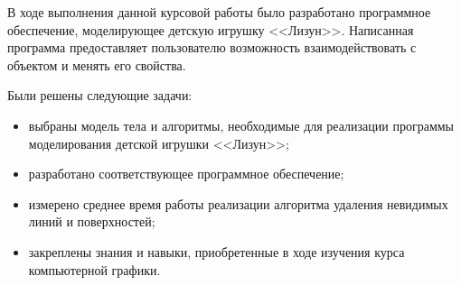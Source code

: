 
В ходе выполнения данной курсовой работы было разработано программное обеспечение, моделирующее детскую игрушку <<Лизун>>. Написанная программа предоставляет пользователю возможность взаимодействовать с объектом и менять его свойства.

Были решены следующие задачи:
\begin{itemize}
	\item выбраны модель тела и алгоритмы, необходимые для реализации программы моделирования детской игрушки <<Лизун>>;
	\item разработано соответствующее программное обеспечение;
	\item измерено среднее время работы реализации алгоритма удаления невидимых линий и поверхностей;
	\item закреплены знания и навыки, приобретенные в ходе изучения курса компьютерной графики.
\end{itemize}
